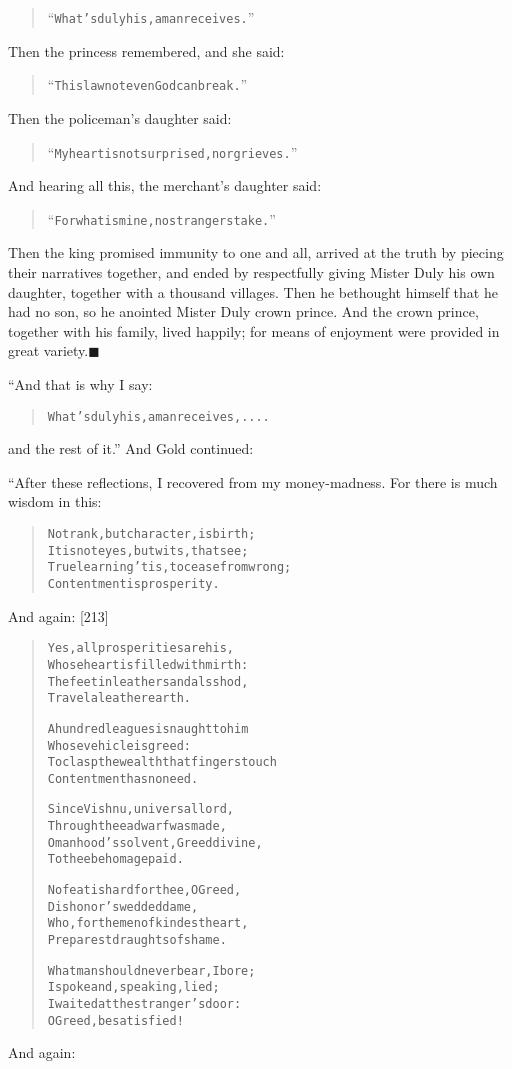 \documentclass[article, twoside, 14pt]{memoir}
\newcommand{\qed}{\hfill \ensuremath{\blacksquare}}
\renewenvironment{verbatim}{%
\begin{quote}%
\vskip -10pt%
\begin{alltt}\normalfont\large}{\end{alltt}%
\end{quote}%
\vskip -10pt
} %
\begin{document}
\begin{verbatim}
“What's duly his, a man receives.”
\end{verbatim}
Then the princess remembered, and she said:

\begin{verbatim}
“This law not even God can break.”
\end{verbatim}
Then the policeman's daughter said:

\begin{verbatim}
“My heart is not surprised, nor grieves.”
\end{verbatim}
And hearing all this, the merchant's daughter said:

\begin{verbatim}
“For what is mine, no strangers take.”
\end{verbatim}
Then the king promised immunity to one and all, arrived at the
truth by piecing their narratives together, and ended by
respectfully giving Mister Duly his own daughter, together with a
thousand villages. Then he bethought himself that he had no son, so
he anointed Mister Duly crown prince. And the crown prince,
together with his family, lived happily; for means of enjoyment
were provided in great variety.\hyperref[s41]{\qed}

“And that is why I say:

\begin{verbatim}
What's duly his, a man receives, ....
\end{verbatim}
and the rest of it.” And Gold continued:

“After these reflections, I recovered from my money-madness. For
there is much wisdom in this:

\begin{verbatim}
Not rank, but character, is birth;
    It is not eyes, but wits, that see;
True learning 'tis, to cease from wrong;
    Contentment is prosperity.
\end{verbatim}
And again: [213]

\begin{verbatim}
Yes, all prosperities are his,
    Whose heart is filled with mirth:
The feet in leather sandals shod,
    Travel a leather earth.

A hundred leagues is naught to him
    Whose vehicle is greed:
To clasp the wealth that fingers touch
    Contentment has no need.

Since Vishnu, universal lord,
    Through thee a dwarf was made,
O manhood's solvent, Greed divine,
    To thee be homage paid.

No feat is hard for thee, O Greed,
    Dishonor's wedded dame,
Who, for the men of kindest heart,
    Preparest draughts of shame.

What man should never bear, I bore;
    I spoke and, speaking, lied;
I waited at the stranger's door:
    O Greed, be satisfied!
\end{verbatim}
And again:
\end{document}
